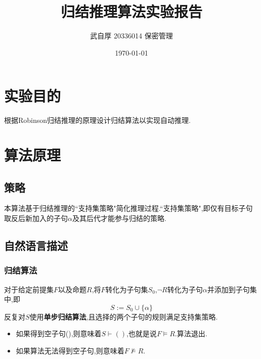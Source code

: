 
\geometry{a4paper}
\title{\textbf{归结推理算法实验报告}}
\author{武自厚 20336014 保密管理}
\date{\today}

\newcommand{\diff}{\mathrm{d}}
\newcommand{\code}[1]{\texttt{#1}}
\newcommand{\true}[0]{\textbf{\textit{true}}}
\newcommand{\false}[0]{\textbf{\textit{false}}}
\newcommand{\inputpy}[3]{\inputminted[firstline=#1,lastline=#2,breaklines,frame=single]{python3}{#3}}
\newcommand{\img}[3]{\begin{figure}[H]
    \centering
    \texttt{[image: \#2]}
    \caption{#3}
\end{figure}}



    \maketitle

    \section{实验目的}

    根据Robinson归结推理的原理设计归结算法以实现自动推理.

    \section{算法原理}

    \subsection{策略}
    本算法基于归结推理的``支持集策略"简化推理过程.``支持集策略",即仅有目标子句取反后新加入的子句\(\alpha\)及其后代才能参与归结的策略.
    
    \subsection{自然语言描述}
    \subsubsection{归结算法}
    对于给定前提集\(F\)以及命题\(R\),将\(F\)转化为子句集\(S_0\),\(\neg R\)转化为子句\(\alpha\)并添加到子句集中,即
    \[S := S_0 \cup \{\alpha\}\]
    反复对\(S\)使用\textbf{单步归结算法},且选择的两个子句的规则满足支持集策略.
    \begin{itemize}
        \item 如果得到空子句(),则意味着\(S \vdash () \),也就是说\(F \models R\).算法退出.
        \item 如果算法无法得到空子句,则意味着\(F \not \models R\).
    \end{itemize}
